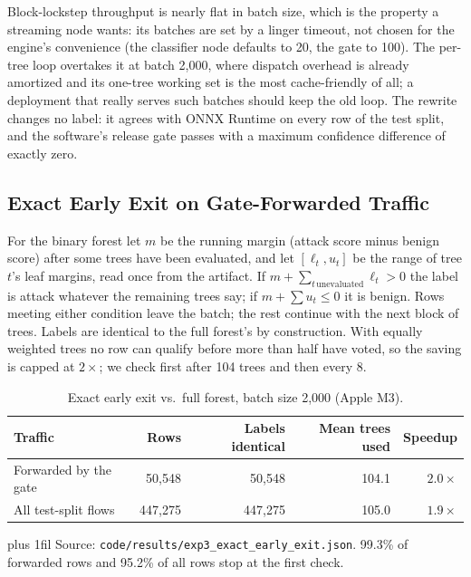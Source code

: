 \documentclass[runningheads]{llncs}
\newcommand{\tabnote}[1]{%
  \vspace{4pt}\par\noindent
  \begin{minipage}{\textwidth}%
    \footnotesize\parindent=0pt\leftskip=0pt\rightskip=0pt\parfillskip=0pt plus 1fil\relax
    #1%
  \end{minipage}}
\begin{document}
Block-lockstep throughput is nearly flat in batch size, which is the property a streaming node wants: its batches are set by a linger timeout, not chosen for the engine's convenience (the classifier node defaults to 20, the gate to 100). The per-tree loop overtakes it at batch 2{,}000, where dispatch overhead is already amortized and its one-tree working set is the most cache-friendly of all; a deployment that really serves such batches should keep the old loop. The rewrite changes no label: it agrees with ONNX Runtime on every row of the test split, and the software's release gate passes with a maximum confidence difference of exactly zero.

\subsection{Exact Early Exit on Gate-Forwarded Traffic}
\label{sec:earlyexit}

For the binary forest let $m$ be the running margin (attack score minus benign score) after some trees have been evaluated, and let $[\ell_t, u_t]$ be the range of tree $t$'s leaf margins, read once from the artifact. If $m + \sum_{t\,\text{unevaluated}} \ell_t > 0$ the label is attack whatever the remaining trees say; if $m + \sum u_t \le 0$ it is benign. Rows meeting either condition leave the batch; the rest continue with the next block of trees. Labels are identical to the full forest's by construction. With equally weighted trees no row can qualify before more than half have voted, so the saving is capped at $2\times$; we check first after 104 trees and then every 8.

\begin{table}[htbp]
  \caption{Exact early exit vs.\ full forest, batch size 2{,}000 (Apple M3).}
  \label{tab:earlyexit}
  \centering
  \small
  \begin{tabular}{l r r r r}
    \toprule
    Traffic & Rows & Labels identical & Mean trees used & Speedup \\
    \midrule
    Forwarded by the gate & 50{,}548  & 50{,}548  & 104.1 & $2.0\times$ \\
    All test-split flows  & 447{,}275 & 447{,}275 & 105.0 & $1.9\times$ \\
    \bottomrule
  \end{tabular}
  \tabnote{Source: \texttt{code/results/exp3\_exact\_early\_exit.json}. 99.3\% of forwarded rows and 95.2\% of all rows stop at the first check.}
\end{table}
\end{document}
